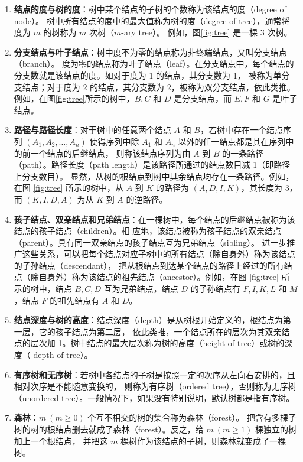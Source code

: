 \documentclass[lang=cn,newtx,10pt,scheme=chinese]{../elegantbook}
\begin{document}
\begin{enumerate}
  \item \textbf{结点的度与树的度}：树中某个结点的子树的个数称为该结点的度（degree of node）。
  树中所有结点的度中的最大值称为树的度（degree of tree），通常将度为 $m$ 的树称为 $m$ 次树（$m$-ary tree）。
  例如，图\ref{fig:tree} 是一棵 3 次树。

  \item \textbf{分支结点与叶子结点}：树中度不为零的结点称为非终端结点，又叫分支结点（branch）。
  度为零的结点称为叶子结点（leaf）。在分支结点中，每个结点的分支数就是该结点的度。如对于度为 1 的结点，其分支数为 1，
  被称为单分支结点；对于度为 2 的结点，其分支数为 2，被称为双分支结点，依此类推。例如，在图\ref{fig:tree}所示的树中，$B, C$ 和 $D$ 是分支结点，而 $E, F$ 和 $G$ 是叶子结点。

  \item \textbf{路径与路径长度}：对于树中的任意两个结点 $A$ 和 $B$，若树中存在一个结点序列 $(A_1, A_2, \dots, A_n)$ 
  使得序列中除 $A_1$ 和 $A_n$ 以外的任一结点都是其在序列中的前一个结点的后继结点，
  则称该结点序列为由 $A$ 到 $B$ 的一条路径（path）。路径长度（path length）是该路径所通过的结点数目减 1（即路径上分支数目）。
  显然，从树的根结点到树中其余结点均存在一条路径。例如，在图 \ref{fig:tree} 所示的树中，从 $A$ 到 $K$ 的路径为 $(A, D, I, K)$，其长度为 3，而 $(K, I, D, A)$ 为从 $K$ 到 $A$ 的逆路径。

  \item \textbf{孩子结点、双亲结点和兄弟结点}：在一棵树中，每个结点的后继结点被称为该结点的孩子结点（children）。相
  应地，该结点被称为孩子结点的双亲结点（parent）。具有同一双亲结点的孩子结点互为兄弟结点（sibling）。
  进一步推广这些关系，可以把每个结点对应子树中的所有结点（除自身外）称为该结点的子孙结点（descendant），
  把从根结点到达某个结点的路径上经过的所有结点（除自身外）称为该结点的祖先结点（ancestor）。例如，在图 \ref{fig:tree} 所示的树中，结点 $B, C, D$ 互为兄弟结点，结点 $D$ 的子孙结点有 $F, I, K, L$ 和 $M$，结点 $F$ 的祖先结点有 $A$ 和 $D$。

  \item \textbf{结点深度与树的高度}：结点深度（depth）是从树根开始定义的，根结点为第一层，它的孩子结点为第二层，
  依此类推，一个结点所在的层次为其双亲结点的层次加 1。树中结点的最大层次称为树的高度（height of tree）或树的深度（
  depth of tree）。

  \item \textbf{有序树和无序树}：若树中各结点的子树是按照一定的次序从左向右安排的，且相对次序是不能随意变换的，
  则称为有序树（ordered tree），否则称为无序树（unordered tree）。一般情况下，如果没有特别说明，默认树都是指有序树。

  \item \textbf{森林}：$m \ (m \geq 0)$ 个互不相交的树的集合称为森林（forest）。
  把含有多棵子树的树的根结点删去就成了森林（forest）。反之，给 $m \ (m \geq 1)$ 棵独立的树加上一个根结点，
  并把这 $m$ 棵树作为该结点的子树，则森林就变成了一棵树。
\end{enumerate}
\end{document}
